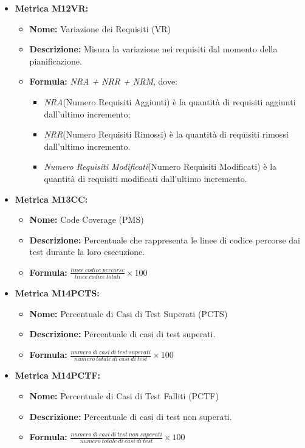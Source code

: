 \begin{itemize}
    \item \textbf{Metrica M12VR:}
          \begin{itemize}
              \item \textbf{Nome:} Variazione dei Requisiti (VR)
              \item \textbf{Descrizione:} Misura la variazione nei requisiti dal momento della pianificazione.
              \item \textbf{Formula:} \textit{NRA + NRR + NRM}, dove:\begin{itemize}
                \item \textit{NRA}(Numero Requisiti Aggiunti) è la quantità di requisiti aggiunti dall'ultimo incremento;
                \item \textit{NRR}(Numero Requisiti Rimossi) è la quantità di requisiti rimossi dall'ultimo incremento.
                \item \textit{Numero Requisiti Modificati}(Numero Requisiti Modificati) è la quantità di requisiti modificati dall'ultimo incremento.
              \end{itemize}
          \end{itemize}

    \item \textbf{Metrica M13CC:}
          \begin{itemize}
           \item \textbf{Nome:} Code Coverage (PMS)
           \item \textbf{Descrizione:} Percentuale che rappresenta le linee di codice percorse dai test durante la loro esecuzione.
           \item \textbf{Formula:} $\frac{linee \ codice \ percorse}{linee \ codice \ totali}\times 100$
          \end{itemize}
    
    \item \textbf{Metrica M14PCTS:}
          \begin{itemize}
           \item \textbf{Nome:} Percentuale di Casi di Test Superati (PCTS)
           \item \textbf{Descrizione:} Percentuale di casi di test superati.
           \item \textbf{Formula:} $\frac{numero \ di \ casi \ di \ test \ superati}{numero \ totale \ di \ casi \ di \ test}\times 100$
          \end{itemize}

    \item \textbf{Metrica M14PCTF:}
          \begin{itemize}
           \item \textbf{Nome:} Percentuale di Casi di Test Falliti (PCTF)
           \item \textbf{Descrizione:} Percentuale di casi di test non superati.
           \item \textbf{Formula:} $\frac{numero \ di \ casi \ di \ test \ non \ superati}{numero \ totale \ di \ casi \ di \ test}\times 100$
          \end{itemize}
\end{itemize}


